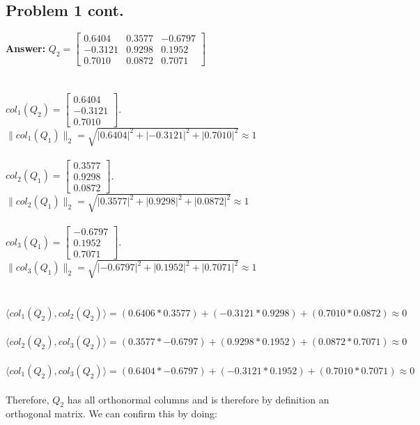 \documentclass[12pt]{article}
\begin{document}
\subsection*{Problem 1 cont.}
\bigskip
\noindent\textbf{Answer:} $Q_2 = \left[\begin{matrix} 0.6404 & 0.3577 & -0.6797 \\ -0.3121 & 0.9298 & 0.1952 \\ 0.7010 & 0.0872 & 0.7071 \end{matrix}\right]$
\\~\\~\\$col_1\left(Q_2\right)=\left[\begin{array}{c}{0.6404} \\ {-0.3121} \\ {0.7010}\end{array}\right]$. $\|col_1\left(Q_1\right)\|_2=\sqrt{|0.6404|^2+|-0.3121|^2+|0.7010|^2}\approx 1$
\\~\\$col_2\left(Q_1\right)=\left[\begin{array}{c}{0.3577} \\ {0.9298} \\ {0.0872}\end{array}\right]$. $\|col_2\left(Q_1\right)\|_2=\sqrt{|0.3577|^2+|0.9298|^2+|0.0872|^2}\approx 1$
\\~\\$col_3\left(Q_1\right)=\left[\begin{array}{c}{-0.6797} \\ {0.1952} \\ {0.7071}\end{array}\right]$. $\|col_3\left(Q_1\right)\|_2=\sqrt{|-0.6797|^2+|0.1952|^2+|0.7071|^2}\approx 1$ 
\\~\\~\\$\langle col_1\left(Q_2\right), col_2\left(Q_2\right)\rangle=(0.6406*0.3577)+(-0.3121*0.9298)+(0.7010*0.0872)\approx 0$
\\~\\$\langle col_2\left(Q_2\right), col_3\left(Q_2\right)\rangle=(0.3577*-0.6797)+(0.9298*0.1952)+(0.0872*0.7071)\approx 0$
\\~\\$\langle col_1\left(Q_2\right), col_3\left(Q_2\right)\rangle=(0.6404*-0.6797)+(-0.3121*0.1952)+(0.7010*0.7071)\approx 0$
\\~\\Therefore, $Q_2$ has all orthonormal columns and is therefore by definition an orthogonal matrix. We can confirm this by doing: 
\end{document}
